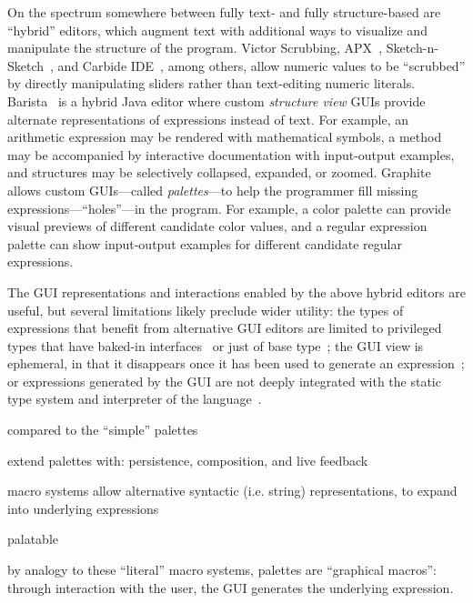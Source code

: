 \documentclass[acmsmall,review,anonymous,nonacm]{acmart}
\theoremstyle{slplain}
\numberwithin{thm}{section}
\begin{document}
On the spectrum somewhere between fully text- and fully structure-based are
``hybrid'' editors, which augment text with additional ways to visualize and
manipulate the structure of the program.
%
Victor Scrubbing, APX~\citep{APX}, Sketch-n-Sketch~\citep{sns-pldi}, and Carbide
IDE~\citep{XXX}, among others, allow numeric values to be ``scrubbed'' by
directly manipulating sliders rather than text-editing numeric literals.
%
Barista~\cite{Barista} is a hybrid Java editor where custom \emph{structure
view} GUIs provide alternate representations of expressions instead of text.
%
For example, an arithmetic expression may be rendered with mathematical symbols,
a method may be accompanied by interactive documentation with input-output
examples, and structures may be selectively collapsed, expanded, or zoomed.
%
Graphite~\citep{Graphite} allows custom GUIs---called \emph{palettes}---to help
the programmer fill missing expressions---``holes''---in the program.
%
For example, a color palette can provide visual previews of different candidate
color values, and a regular expression palette can show input-output examples
for different candidate regular expressions.

The GUI representations and interactions enabled by the above hybrid editors are
useful, but several limitations likely preclude wider utility:
%
the types of expressions that benefit from alternative GUI editors are limited
to
%
privileged types that have baked-in interfaces~\citep{XXX}
%
or just of base type~\citep{XXX};
%
the GUI view is ephemeral, in that it disappears once it has been used to
generate an expression~\citep{XXX}; or
%
expressions generated by the GUI are not deeply integrated with the static type
system and interpreter of the language~\citep{XXX,XXX,XXX}.





compared to the ``simple'' palettes

extend palettes with: persistence, composition, and live feedback

macro systems allow alternative syntactic (i.e. string) representations, to
expand into underlying expressions

palatable

by analogy to these ``literal'' macro systems, palettes are ``graphical
macros'': through interaction with the user, the GUI generates the underlying
expression.
\end{document}
